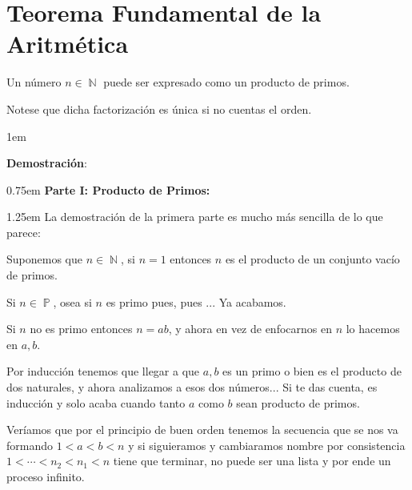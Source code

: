 \documentclass[12pt, fleqn]{report}                             %
\newenvironment{Indentation}[1][0.75em]                         %
    {\begin{adjustwidth}{#1}{}}                                     %
    {\end{adjustwidth}}                                             %
\newenvironment{SmallIndentation}[1][0.75em]                    %
    {\begin{adjustwidth}{#1}{}\begin{footnotesize}}                 %
    {\end{footnotesize}\end{adjustwidth}}                           %
\DeclareMathOperator \Naturals  {\mathbb{N}}                     %
\DeclareMathOperator \Primes    {\mathbb{P}}                     %
\begin{document}
    \clearpage
    \section{Teorema Fundamental de la Aritmética}

        Un número $n \in \Naturals$ puede ser expresado como
        un producto de primos.

        Notese que dicha factorización es única si no cuentas el 
        orden.

        \begin{SmallIndentation}[1em]
            \textbf{Demostración}:\\


            \begin{Indentation}[0.75em]
                \textbf{Parte I: Producto de Primos:}
            \end{Indentation}

            \begin{Indentation}[1.25em]
                La demostración de la primera parte es mucho más sencilla
                de lo que parece:

                Suponemos que $n \in \Naturals$, si $n=1$ entonces $n$ es el
                producto de un conjunto vacío de primos.

                Si $n \in \Primes$, osea si $n$ es primo pues, pues ... Ya acabamos.

                Si $n$ no es primo entonces $n=ab$, y ahora en vez de enfocarnos en 
                $n$ lo hacemos en $a,b$.

                Por inducción tenemos que llegar a que $a,b$ es un primo o bien
                es el producto de dos naturales, y ahora analizamos a esos dos números...
                Si te das cuenta, es inducción y solo acaba cuando tanto $a$ como $b$ sean
                producto de primos.

                Veríamos que por el principio de buen orden tenemos la secuencia que se
                nos va formando $1 < a < b < n$ y si siguieramos y cambiaramos nombre
                por consistencia $1 <\cdots<n_2<n_1<n$ tiene que terminar, no puede ser
                una lista y por ende un proceso infinito.


\end{Indentation}
\end{SmallIndentation}
\end{document}
